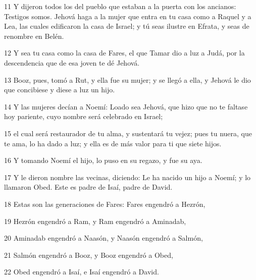 \par 11 Y dijeron todos los del pueblo que estaban a la puerta con los ancianos: Testigos somos. Jehová haga a la mujer que entra en tu casa como a Raquel y a Lea, las cuales edificaron la casa de Israel; y tú seas ilustre en Efrata, y seas de renombre en Belén.
\par 12 Y sea tu casa como la casa de Fares, el que Tamar dio a luz a Judá, por la descendencia que de esa joven te dé Jehová.
\par 13 Booz, pues, tomó a Rut, y ella fue su mujer; y se llegó a ella, y Jehová le dio que concibiese y diese a luz un hijo.
\par 14 Y las mujeres decían a Noemí: Loado sea Jehová, que hizo que no te faltase hoy pariente, cuyo nombre será celebrado en Israel;
\par 15 el cual será restaurador de tu alma, y sustentará tu vejez; pues tu nuera, que te ama, lo ha dado a luz; y ella es de más valor para ti que siete hijos.
\par 16 Y tomando Noemí el hijo, lo puso en su regazo, y fue su aya.
\par 17 Y le dieron nombre las vecinas, diciendo: Le ha nacido un hijo a Noemí; y lo llamaron Obed. Este es padre de Isaí, padre de David.
\par 18 Estas son las generaciones de Fares: Fares engendró a Hezrón,
\par 19 Hezrón engendró a Ram, y Ram engendró a Aminadab,
\par 20 Aminadab engendró a Naasón, y Naasón engendró a Salmón,
\par 21 Salmón engendró a Booz, y Booz engendró a Obed,
\par 22 Obed engendró a Isaí, e Isaí engendró a David.

